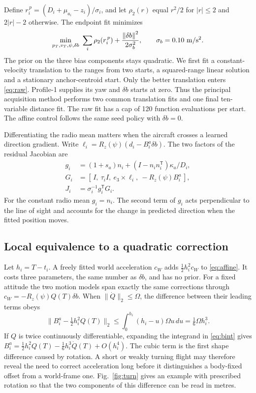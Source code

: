 \documentclass{IEEEtaes}
\newcommand{\rz}{R_z}
\newcommand{\norm}[1]{\left\lVert#1\right\rVert}
\newcommand{\trans}{^{\mathsf T}}
\begin{document}
Define \(r_i^{\,p}=(D_i+\mu_{a_i}-z_i)/\sigma_i\), and let \(\rho_2(r)\) equal \(r^2/2\) for \(|r|\le2\) and \(2|r|-2\) otherwise. The endpoint fit minimizes
\begin{equation}
 \min_{p_T,v_T,\psi,\delta b}\ \sum_i\rho_2(r_i^{\,p})+\frac{\norm{\delta b}^2}{2\sigma_b^2},
 \qquad \sigma_b=0.10\ {\rm m/s^2}. \label{eq:raw}
\end{equation}
The prior on the three bias components stays quadratic. We first fit a constant-velocity translation to the ranges from two starts, a squared-range linear solution and a stationary anchor-centroid start. Only the better translation enters \eqref{eq:raw}. Profile-1 supplies its yaw and \(\delta b\) starts at zero. Thus the principal acquisition method performs two common translation fits and one final ten-variable distance fit. The raw fit has a cap of 120 function evaluations per start. The affine control follows the same seed policy with \(\delta b=0\).

Differentiating the radio mean matters when the aircraft crosses a learned direction gradient. Write \(\ell_i=\rz(\psi)(d_i-B_i^a\delta b)\). The two factors of the residual Jacobian are
\begin{align}
 g_i &= (1+s_a)n_i+(I-n_i n_i\trans)\kappa_a/D_i,\nonumber\\
 G_i &= [\,I,\ \tau_i I,\ e_3\times\ell_i,\ -\rz(\psi)B_i^a\,],\nonumber\\
 J_i &= \sigma_i^{-1} g_i\trans G_i . \label{eq:jac}
\end{align}
For the constant radio mean \(g_i=n_i\). The second term of \(g_i\) acts perpendicular to the line of sight and accounts for the change in predicted direction when the fitted position moves.

\subsection{Local equivalence to a quadratic correction}
Let \(h_i=T-t_i\). A freely fitted world acceleration \(c_W\) adds \(\tfrac12 h_i^2 c_W\) to \eqref{eq:affine}. It costs three parameters, the same number as \(\delta b\), and has no prior. For a fixed attitude the two motion models span exactly the same corrections through \(c_W=-\rz(\psi)Q(T)\delta b\). When \(\|\dot Q\|_2\le\Omega\), the difference between their leading terms obeys
\begin{equation}
 \big\| B_i^a-\tfrac12 h_i^2 Q(T)\big\|_2
 \le \int_0^{h_i}(h_i-u)\Omega u\,du
 =\tfrac16\Omega h_i^3 . \label{eq:bound}
\end{equation}
If \(Q\) is twice continuously differentiable, expanding the integrand in \eqref{eq:bint} gives \(B_i^a=\tfrac12h_i^2 Q(T)-\tfrac16h_i^3\dot Q(T)+O(h_i^4)\). The cubic term is the first shape difference caused by rotation. A short or weakly turning flight may therefore reveal the need to correct acceleration long before it distinguishes a body-fixed offset from a world-frame one. Fig.~\ref{fig:turn} gives an example with prescribed rotation so that the two components of this difference can be read in metres.
\end{document}
